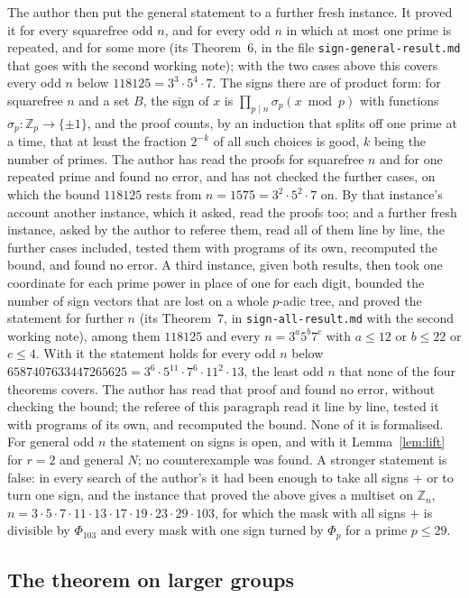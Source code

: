 \documentclass[11pt,a4paper]{amsart}
\theoremstyle{definition}
\theoremstyle{remark}
\newcommand{\Z}{\mathbb{Z}}
\begin{document}
The author then put the general statement to a further fresh instance. It proved it for every squarefree odd $n$,
and for every odd $n$ in which at most one prime is repeated, and for some more (its Theorem~6, in the file
\texttt{sign-general-result.md} that goes with the second working note); with the two cases above this covers every
odd $n$ below $118125=3^3\cdot5^4\cdot7$. The signs there are of product form: for squarefree $n$ and a set $B$,
the sign of $x$ is $\prod_{p\mid n}\sigma_p(x\bmod p)$ with functions $\sigma_p\colon\Z_p\to\{\pm1\}$, and the proof
counts, by an induction that splits off one prime at a time, that at least the fraction $2^{-k}$ of all such choices
is good, $k$ being the number of primes. The author has read the proofs for squarefree $n$ and for one repeated prime and found no error, and has not checked the further cases, on which the bound $118125$ rests from $n=1575=3^2\cdot5^2\cdot7$ on. By that instance's account another instance, which it asked, read the proofs too; and a further fresh instance, asked by the author to referee them, read all of them line by line, the further cases included, tested them with programs of its own, recomputed the bound, and found no error. A third instance, given both results, then took one coordinate for each prime power in place of one for each digit, bounded the
number of sign vectors that are lost on a whole $p$-adic tree, and proved the statement for further $n$ (its Theorem~7, in
\texttt{sign-all-result.md} with the second working note), among them $118125$ and every $n=3^a5^b7^c$ with $a\le12$ or $b\le22$
or $c\le4$. With it the statement holds for every odd $n$ below $6587407633447265625=3^6\cdot5^{11}\cdot7^6\cdot11^2\cdot13$, the
least odd $n$ that none of the four theorems covers. The author has read that proof and found no error, without checking the
bound; the referee of this paragraph read it line by line, tested it with programs of its own, and recomputed the bound.
None of it is formalised. For general odd $n$ the statement on signs is
open, and with it Lemma~\ref{lem:lift} for $r=2$ and general $N$; no counterexample was found. A stronger statement
is false: in every search of the author's it had been enough to take all signs $+$ or to turn one sign, and the instance that proved the above gives a multiset on $\Z_n$, $n=3\cdot5\cdot7\cdot11\cdot13\cdot17\cdot19\cdot23\cdot29\cdot103$, for which the mask
with all signs $+$ is divisible by $\Phi_{103}$ and every mask with one sign turned by $\Phi_p$ for a prime $p\le29$.

\subsection*{The theorem on larger groups}
\end{document}

